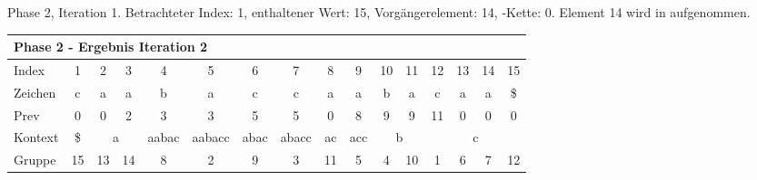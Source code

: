 \begin{table}[H]
\caption[Phase 2, Iteration 1]{Phase 2, Iteration 1. Betrachteter Index: 1, enthaltener Wert: 15, Vorgängerelement: 14, \prevpointer-Kette: 0. Element 14 wird in \sa aufgenommen.}
\label{table_complex_example_2_1} 
\end{table}

\begin{table}[H]
\centering
\begin{adjustbox}{max width=\textwidth}
\centering
\begin{tabular}{lccccccccccccccc}
\multicolumn{16}{l}{Phase 2 - Ergebnis Iteration 2}                                                                                                                                                                                                                                                                                                                   \\ \hline
\multicolumn{1}{l|}{Index}   & 1                       & 2                          & 3                                               & 4                          & 5                           & 6                         & 7                          & 8                       & 9                        & 10 & 11                      & 12  & 13  & 14  & 15  \\
\multicolumn{1}{l|}{Zeichen} & c                       & a                          & a                                               & b                          & a                           & c                         & c                          & a                       & a                        & b  & a                       & c   & a   & a   & \$  \\
\multicolumn{1}{l|}{Prev}    & 0                       & 0                          & 2                                               & 3                          & 3                           & 5                         & 5                          & 0                       & 8                        & 9  & 9                       & 11  & 0   & 0   & 0   \\ \hline
\multicolumn{1}{l|}{Kontext} & \multicolumn{1}{c|}{\$} & \multicolumn{2}{c|}{a}                                                       & \multicolumn{1}{c|}{aabac} & \multicolumn{1}{c|}{aabacc} & \multicolumn{1}{c|}{abac} & \multicolumn{1}{c|}{abacc} & \multicolumn{1}{c|}{ac} & \multicolumn{1}{c|}{acc} & \multicolumn{2}{c|}{b}       & \multicolumn{4}{c}{c} \\
\multicolumn{1}{l|}{Gruppe}  & \multicolumn{1}{c|}{15} & 13                         & \multicolumn{1}{c|}{14}                         & \multicolumn{1}{c|}{8}     & \multicolumn{1}{c|}{2}      & \multicolumn{1}{c|}{9}    & \multicolumn{1}{c|}{3}     & \multicolumn{1}{c|}{11} & \multicolumn{1}{c|}{5}   & 4  & \multicolumn{1}{c|}{10} & 1   & 6   & 7   & 12  \\

\end{tabular}
\end{adjustbox}
\end{table}
